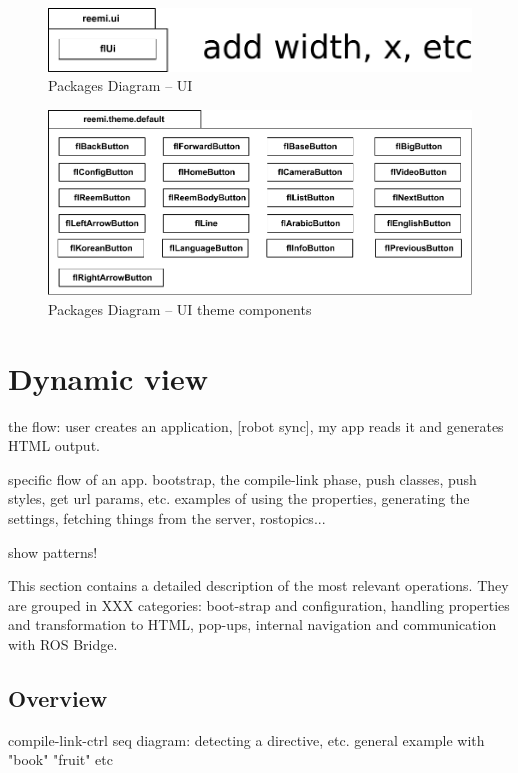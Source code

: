 \begin{figure}[htb]
    \centering
    \includegraphics{figures/design-package-ui.pdf}
    \caption{Packages Diagram -- UI}
    \label{fig:pkg-ui}
\end{figure}

\begin{figure}[htb]
    \centering
    \includegraphics{figures/design-package-uithemecomponents.pdf}
    \caption{Packages Diagram -- UI theme components}
    \label{fig:pkg-themecomponents}
\end{figure}

\FloatBarrier

\section{Dynamic view}
the flow: user creates an application, [robot sync], my app reads it and generates HTML output.

specific flow of an app. bootstrap, the compile-link phase, push classes, push styles, get url params, etc.
examples of using the properties, generating the settings, fetching things from the server, rostopics...

show patterns!

This section contains a detailed description of the most relevant operations.
They are grouped in XXX categories: boot-strap and configuration, handling properties and transformation to \ac{HTML}, pop-ups, internal navigation and communication with ROS Bridge.

\subsection{Overview}
compile-link-ctrl
seq diagram: detecting a directive, etc. general example with "book" "fruit" etc

